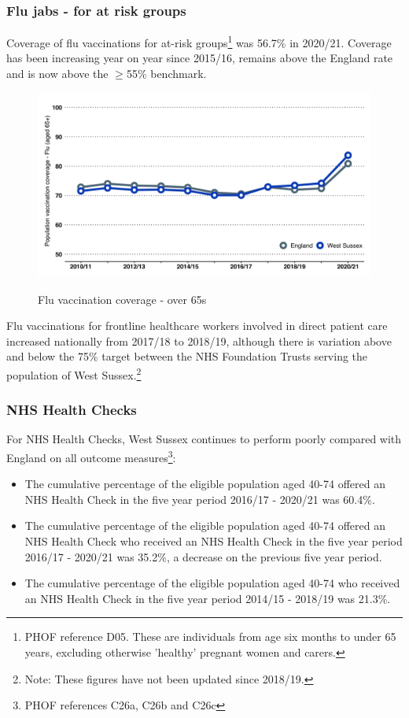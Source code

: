 \subsubsection{Flu jabs - for at risk groups} Coverage of flu vaccinations for at-risk groups\footnote{PHOF reference D05. These are individuals from age six months to under 65 years, excluding otherwise 'healthy' pregnant women and carers.} was 56.7\% in 2020/21. Coverage has been increasing year on year since 2015/16, remains above the England rate and is now above the $\geq$55\% benchmark.

\begin{figure}[htp]
    \caption{Flu vaccination coverage - over 65s}
    \centering
    \includegraphics[width=\linewidth]{images/65over_vaccine_flu.png}
    \label{fig:flu_vax_coverage}
\end{figure}

Flu vaccinations for frontline healthcare workers involved in direct patient care increased nationally from 2017/18 to 2018/19, although there is variation above and below the 75\% target between the NHS Foundation Trusts serving the population of West Sussex.\footnote{Note: These figures have not been updated since 2018/19.}

\subsubsection{NHS Health Checks} For NHS Health Checks, West Sussex continues to perform poorly compared with England on all outcome measures\footnote{PHOF references C26a, C26b and C26c}:

\begin{itemize}[noitemsep]
    \item The cumulative percentage of the eligible population aged 40-74 offered an NHS Health Check in the five year period 2016/17 - 2020/21 was 60.4\%.
    \item The cumulative percentage of the eligible population aged 40-74 offered an NHS Health Check who received an NHS Health Check in the five year period 2016/17 - 2020/21 was 35.2\%, a decrease on the previous five year period.
    \item The cumulative percentage of the eligible population aged 40-74 who received an NHS Health Check in the five year period 2014/15 - 2018/19 was 21.3\%.
\end{itemize}


